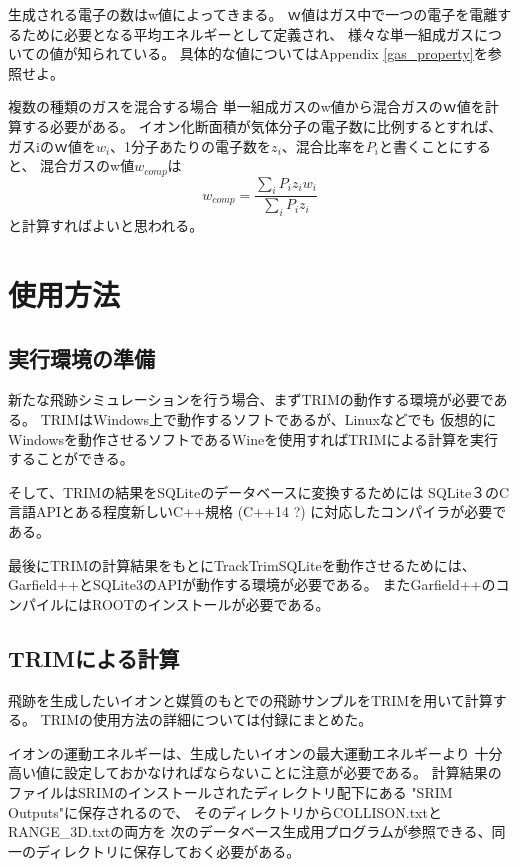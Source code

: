 \documentclass [11pt,a4paper,dvipdfmx] {jarticle}
\begin{document}
生成される電子の数はw値によってきまる。
ｗ値はガス中で一つの電子を電離するために必要となる平均エネルギーとして定義され、
様々な単一組成ガスについての値が知られている。
具体的な値についてはAppendix \ref{gas_property}を参照せよ。

複数の種類のガスを混合する場合
単一組成ガスのw値から混合ガスのｗ値を計算する必要がある。
イオン化断面積が気体分子の電子数に比例するとすれば、
ガスiのｗ値を$w_i$、1分子あたりの電子数を$z_i$、混合比率を$P_i$と書くことにすると、
混合ガスのw値$w_{comp}$は
\begin{equation}
w_{comp} = \frac{\sum_{i}P_i z_i w_i}{\sum_{i}P_i z_i}
\end{equation}
と計算すればよいと思われる。


\section{使用方法}

\subsection{実行環境の準備}
新たな飛跡シミュレーションを行う場合、まずTRIMの動作する環境が必要である。
TRIMはWindows上で動作するソフトであるが、Linuxなどでも
仮想的にWindowsを動作させるソフトであるWineを使用すればTRIMによる計算を実行することができる。

そして、TRIMの結果をSQLiteのデータベースに変換するためには
SQLite３のC言語APIとある程度新しいC++規格 (C++14 ?) に対応したコンパイラが必要である。

最後にTRIMの計算結果をもとにTrackTrimSQLiteを動作させるためには、
Garfield++とSQLite3のAPIが動作する環境が必要である。
またGarfield++のコンパイルにはROOTのインストールが必要である。

\subsection{TRIMによる計算}
飛跡を生成したいイオンと媒質のもとでの飛跡サンプルをTRIMを用いて計算する。
TRIMの使用方法の詳細については付録にまとめた。

イオンの運動エネルギーは、生成したいイオンの最大運動エネルギーより
十分高い値に設定しておかなければならないことに注意が必要である。
計算結果のファイルはSRIMのインストールされたディレクトリ配下にある
"SRIM Outputs"に保存されるので、
そのディレクトリからCOLLISON.txtとRANGE\_3D.txtの両方を
次のデータベース生成用プログラムが参照できる、同一のディレクトリに保存しておく必要がある。
\end{document}
